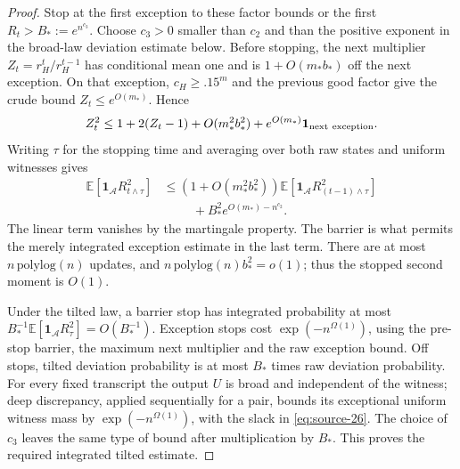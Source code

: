 \begin{proof}
Stop at the first exception to these factor bounds or the first
\(R_t>B_*:=e^{n^{c_3}}\). Choose \(c_3>0\) smaller than \(c_2\)
and than the positive exponent in the broad-law deviation estimate
below. Before stopping, the next multiplier
\(Z_t=r_H^t/r_H^{t-1}\) has conditional mean one and is
\(1+O(m_*b_*)\) off the next exception. On that exception,
\(c_H\ge .15^m\) and the previous good factor give the crude
bound \(Z_t\le e^{O(m_*)}\). Hence
\[
 Z_t^2\le1+2(Z_t-1)+O(m_*^2b_*^2)
                   +e^{O(m_*)}\mathbf1_{\rm next\ exception}.
\]
Writing \(\tau\) for the stopping time and averaging over both raw
states and uniform witnesses gives
\begin{align*}
 \mathbb E[\mathbf1_{\mathcal A}R_{t\wedge\tau}^2]
 &\le (1+O(m_*^2b_*^2))
       \mathbb E[\mathbf1_{\mathcal A}R_{(t-1)\wedge\tau}^2]\\
 &\hspace{1cm}+B_*^2e^{O(m_*)-n^{c_2}}.
\end{align*}
The linear term vanishes by the martingale property. The barrier is
what permits the merely integrated exception estimate in the last
term. There are at most \(n\,\mathrm{polylog}(n)\) updates, and
\(n\,\mathrm{polylog}(n)b_*^2=o(1)\); thus the stopped second
moment is \(O(1)\).

Under the tilted law, a barrier stop has integrated probability at
most \(B_*^{-1}\mathbb E[\mathbf1_{\mathcal A}R_\tau^2]=O(B_*^{-1})\).
Exception stops cost \(\exp(-n^{\Omega(1)})\), using the pre-stop
barrier, the maximum next multiplier and the raw exception bound.
Off stops, tilted deviation probability is at most \(B_*\) times
raw deviation probability. For every fixed transcript the output
\(U\) is broad and independent of the witness; deep discrepancy,
applied sequentially for a pair, bounds its exceptional uniform
witness mass by \(\exp(-n^{\Omega(1)})\), with the slack in
\eqref{eq:source-26}. The choice of \(c_3\) leaves the same type of
bound after multiplication by \(B_*\). This proves the required
integrated tilted estimate.


\end{proof}
